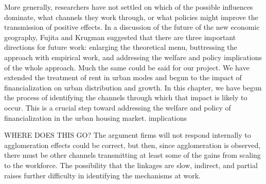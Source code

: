  More generally, researchers have not settled on which  of the possible influences dominate, what channels they work through, or what policies might improve the transmission of positive effects. %
In a discussion of the  future of the new economic geography, Fujita and Krugman suggested that there are three important directions for future work: enlarging the theoretical menu, buttressing the approach with empirical work, and addressing the welfare and policy implications of the whole approach. Much the same could be said for our project. We have extended the treatment of rent in urban modes and begun to the impact of financialization on urban distribution and growth. In this chapter, we have begun the process of identifying the channels through which that impact is likely to occur. This is a crucial step toward  addressing the welfare and policy  of financialization in the urban housing market.
 implications

WHERE DOES THIS GO? The argument firms will not respond internally to agglomeration effects could be correct, but then, since agglomeration is observed, there must  be other channels  transmitting at least some of the gains from scaling to the workforce. 
The possibility that the linkages are slow, indirect, and partial raises further difficulty in identifying the mechanisms at work.







